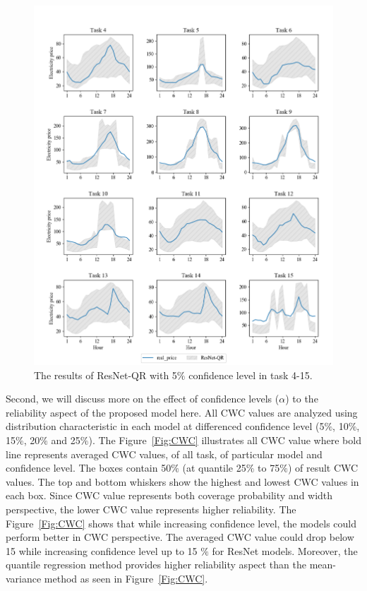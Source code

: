 \documentclass[review]{elsarticle}
\begin{document}
    \begin{figure}[H]
      \centering
      \includegraphics[width=15cm]{All_task_with_spike_price_QR_005}
      \caption{The results of ResNet-QR with 5$\%$ confidence level in task 4-15.}
      \label{Fig:all_task_QR_005}
    \end{figure}

    Second, we will discuss more on the effect of confidence levels ($\alpha$) to the reliability aspect of the proposed model here.
    All CWC values are analyzed using distribution characteristic in each model at differenced confidence level (5$\%$, 10$\%$, 15$\%$, 20$\%$ and 25$\%$).
    The Figure~\ref{Fig:CWC} illustrates all CWC value where bold line represents averaged CWC values, of all task, of particular model and confidence level.
    The boxes contain 50$\%$ (at quantile 25$\%$ to 75$\%$) of result CWC values.
    The top and bottom whiskers show the highest and lowest CWC values in each box.
    Since CWC value represents both coverage probability and width perspective, the lower CWC value represents higher reliability.
    The Figure~\ref{Fig:CWC} shows that while increasing confidence level, the models could perform better in CWC perspective.
    The averaged CWC value could drop below 15 while increasing confidence level up to 15 $\%$ for ResNet models.
    Moreover, the quantile regression method provides higher reliability aspect than the mean-variance method as seen in Figure~\ref{Fig:CWC}.
\end{document}
